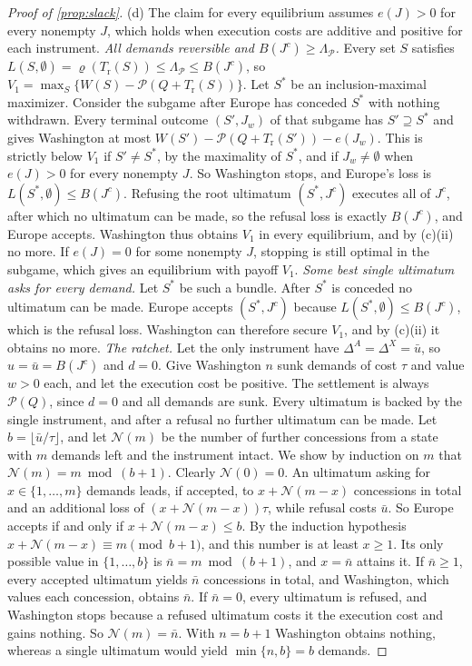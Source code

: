 \begin{proof}[Proof of \cref{prop:slack}]
(d) The claim for every equilibrium assumes $e(J)>0$ for every nonempty $J$, which holds when execution costs are additive and positive for each instrument.
\emph{All demands reversible and $B(J^c)\ge\Lambda_{\mathcal P}$.} Every set $S$ satisfies $L(S,\emptyset)=\varrho(T_{\mathrm r}(S))\le\Lambda_{\mathcal P}\le B(J^c)$, so $V_1=\max_S\{W(S)-\mathcal P(Q+T_{\mathrm r}(S))\}$. Let $S^*$ be an inclusion-maximal maximizer. Consider the subgame after Europe has conceded $S^*$ with nothing withdrawn. Every terminal outcome $(S',J_w)$ of that subgame has $S'\supseteq S^*$ and gives Washington at most $W(S')-\mathcal P(Q+T_{\mathrm r}(S'))-e(J_w)$. This is strictly below $V_1$ if $S'\ne S^*$, by the maximality of $S^*$, and if $J_w\ne\emptyset$ when $e(J)>0$ for every nonempty $J$. So Washington stops, and Europe's loss is $L(S^*,\emptyset)\le B(J^c)$. Refusing the root ultimatum $(S^*,J^c)$ executes all of $J^c$, after which no ultimatum can be made, so the refusal loss is exactly $B(J^c)$, and Europe accepts. Washington thus obtains $V_1$ in every equilibrium, and by (c)(ii) no more. If $e(J)=0$ for some nonempty $J$, stopping is still optimal in the subgame, which gives an equilibrium with payoff $V_1$.
\emph{Some best single ultimatum asks for every demand.} Let $S^*$ be such a bundle. After $S^*$ is conceded no ultimatum can be made. Europe accepts $(S^*,J^c)$ because $L(S^*,\emptyset)\le B(J^c)$, which is the refusal loss. Washington can therefore secure $V_1$, and by (c)(ii) it obtains no more.
\emph{The ratchet.} Let the only instrument have $\Delta^A=\Delta^X=\bar u$, so $u=\bar u=B(J^c)$ and $d=0$. Give Washington $n$ sunk demands of cost $\tau$ and value $w>0$ each, and let the execution cost be positive. The settlement is always $\mathcal P(Q)$, since $d=0$ and all demands are sunk. Every ultimatum is backed by the single instrument, and after a refusal no further ultimatum can be made. Let $b=\lfloor\bar u/\tau\rfloor$, and let $\mathcal N(m)$ be the number of further concessions from a state with $m$ demands left and the instrument intact. We show by induction on $m$ that $\mathcal N(m)=m\bmod(b+1)$. Clearly $\mathcal N(0)=0$. An ultimatum asking for $x\in\{1,\dots,m\}$ demands leads, if accepted, to $x+\mathcal N(m-x)$ concessions in total and an additional loss of $(x+\mathcal N(m-x))\tau$, while refusal costs $\bar u$. So Europe accepts if and only if $x+\mathcal N(m-x)\le b$. By the induction hypothesis $x+\mathcal N(m-x)\equiv m\pmod{b+1}$, and this number is at least $x\ge 1$. Its only possible value in $\{1,\dots,b\}$ is $\bar n=m\bmod(b+1)$, and $x=\bar n$ attains it. If $\bar n\ge 1$, every accepted ultimatum yields $\bar n$ concessions in total, and Washington, which values each concession, obtains $\bar n$. If $\bar n=0$, every ultimatum is refused, and Washington stops because a refused ultimatum costs it the execution cost and gains nothing. So $\mathcal N(m)=\bar n$. With $n=b+1$ Washington obtains nothing, whereas a single ultimatum would yield $\min\{n,b\}=b$ demands.
\end{proof}

